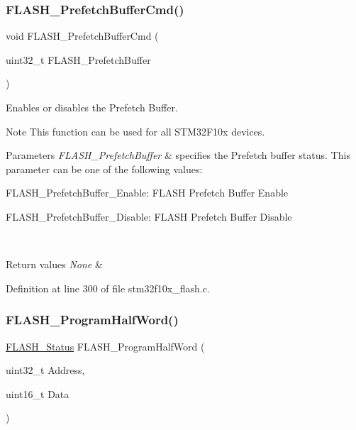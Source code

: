 \subsubsection{\texorpdfstring{F\+L\+A\+S\+H\+\_\+\+Prefetch\+Buffer\+Cmd()}{FLASH\_PrefetchBufferCmd()}}
{\footnotesize\ttfamily void F\+L\+A\+S\+H\+\_\+\+Prefetch\+Buffer\+Cmd (\begin{DoxyParamCaption}\item[{uint32\+\_\+t}]{F\+L\+A\+S\+H\+\_\+\+Prefetch\+Buffer }\end{DoxyParamCaption})}



Enables or disables the Prefetch Buffer. 

\begin{DoxyNote}{Note}
This function can be used for all S\+T\+M32\+F10x devices. 
\end{DoxyNote}

\begin{DoxyParams}{Parameters}
{\em F\+L\+A\+S\+H\+\_\+\+Prefetch\+Buffer} & specifies the Prefetch buffer status. This parameter can be one of the following values\+: \begin{DoxyItemize}
\item F\+L\+A\+S\+H\+\_\+\+Prefetch\+Buffer\+\_\+\+Enable\+: F\+L\+A\+SH Prefetch Buffer Enable \item F\+L\+A\+S\+H\+\_\+\+Prefetch\+Buffer\+\_\+\+Disable\+: F\+L\+A\+SH Prefetch Buffer Disable \end{DoxyItemize}
\\
\hline
\end{DoxyParams}

\begin{DoxyRetVals}{Return values}
{\em None} & \\
\hline
\end{DoxyRetVals}


Definition at line 300 of file stm32f10x\+\_\+flash.\+c.

\mbox{\label{group___f_l_a_s_h___private___functions_ga5c1336f667950a8765887228f1d0d501}} 
\subsubsection{\texorpdfstring{F\+L\+A\+S\+H\+\_\+\+Program\+Half\+Word()}{FLASH\_ProgramHalfWord()}}
{\footnotesize\ttfamily \hyperlink{group___f_l_a_s_h___exported___types_gadc63a6f3404ff1f71229a66915e9cdc0}{F\+L\+A\+S\+H\+\_\+\+Status} F\+L\+A\+S\+H\+\_\+\+Program\+Half\+Word (\begin{DoxyParamCaption}\item[{uint32\+\_\+t}]{Address,  }\item[{uint16\+\_\+t}]{Data }\end{DoxyParamCaption})}



